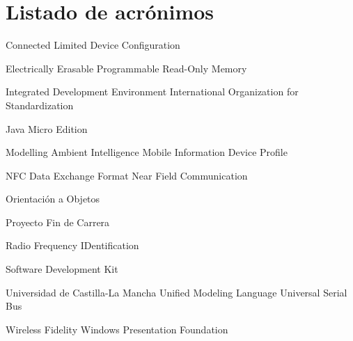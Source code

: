 
\chapter{Listado de acrónimos}

{\small
\begin{acronym}[XXXXXXXX]
      {Connected Limited Device Configuration}

       {Electrically Erasable Programmable Read-Only Memory}

       {Integrated Development Environment}
       {International Organization for Standardization}

    {Java Micro Edition}

      {Modelling Ambient Intelligence}
      {Mobile Information Device Profile}

      {NFC Data Exchange Format}
       {Near Field Communication}

        {Orientación a Objetos}

        {Proyecto Fin de Carrera}

      {Radio Frequency IDentification}

       {Software Development Kit}

      {Universidad de Castilla-La Mancha}
       {Unified Modeling Language}
       {Universal Serial Bus}

      {Wireless Fidelity}
       {Windows Presentation Foundation}
\end{acronym}
}




